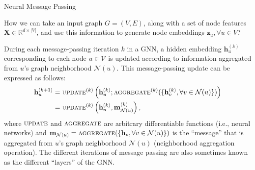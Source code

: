 \documentclass[10pt, aspectratio=169, compress, protectframetitle, handout]{beamer}
\begin{document}
\begin{frame}{Neural Message Passing}

    How we can take an input graph $G = (V, E)$, along with a set of node features $\mathbf X \in \mathbb R^{d \times |V|}$, and use this information to generate node embeddings $\mathbf z_u, \forall u \in V$?
    
    During each message-passing iteration $k$ in a GNN, a \alert{hidden embedding} $\mathbf h^{(k)}_u$ corresponding to each node $u \in \mathcal V$ is updated according to information aggregated from $u$'s graph neighborhood $\mathcal N(u)$. This message-passing update can be expressed as follows:
    \begin{align}
        \mathbf h^{(k+1)}_u &= \textsc{update}^{(k)} \left( \mathbf h^{(k)}_u; \textsc{aggregate}^{(k)}(\{\mathbf h^{(k)}_v, \forall v \in \mathcal N(u)\}) \right) 
        \label{eq:mess-pass} \\
        &= \textsc{update}^{(k)} \left( \mathbf h^{(k)}_u, \mathbf m^{(k)}_{\mathcal N(u)} \right),
        \label{eq:mess-pass2}
    \end{align}
    where $\textsc{update}$ and $\textsc{aggregate}$ are arbitrary differentiable functions (i.e., neural networks) and $\mathbf m_{\mathcal N(u)} = \textsc{aggregate}(\{\mathbf h_v, \forall v \in \mathcal N(u)\})$ is the ``message'' that is aggregated from $u$'s graph neighborhood $\mathcal N(u)$ (\alert{neighborhood aggregation operation}). The different iterations of message passing are also sometimes known as the different ``layers'' of the GNN.

\end{frame}
\end{document}

